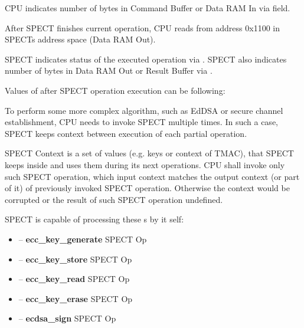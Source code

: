 CPU indicates number of bytes in Command Buffer or Data RAM In via \linebreak
{} field.

After SPECT finishes current operation, CPU reads  from address \linebreak
0x1100 in SPECTs address space (Data RAM Out).




SPECT indicates status of the executed operation via . SPECT also
indicates number of bytes in Data RAM Out or Result Buffer via \linebreak {}.

\vspace{.3cm}

\clearpage
Values of  after SPECT operation execution can be following:



To perform some more complex algorithm, such as EdDSA or secure channel establishment,
CPU needs to invoke SPECT multiple times. In such a case, SPECT keeps context between
execution of each partial operation.

SPECT Context is a set of values (e.g. keys or context of TMAC), that SPECT keeps inside
and uses them during its next operations. CPU shall invoke only such SPECT operation,
which input context matches the output context (or part of it) of previously invoked
SPECT operation. Otherwise the context would be corrupted or the result of such SPECT
operation undefined.

SPECT is capable of processing these \LLLCMD{}s by it self:
\begin{itemize}
    \item {} -- \textbf{ecc_key_generate} SPECT Op
    \item {} -- \textbf{ecc_key_store} SPECT Op
    \item {} -- \textbf{ecc_key_read} SPECT Op
    \item {} -- \textbf{ecc_key_erase} SPECT Op
    \item {} -- \textbf{ecdsa_sign} SPECT Op
\end{itemize}

